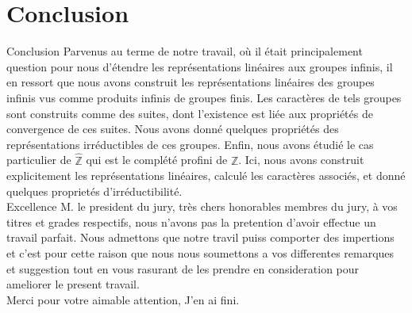 \documentclass[9pt]{beamer}
\begin{document}
	
	\section{Conclusion}
	\begin{frame}{Conclusion}
	Parvenus au terme de notre travail, où il était principalement question pour nous d'étendre les représentations linéaires aux groupes infinis, il en ressort que nous avons construit les représentations linéaires des groupes infinis vus comme produits infinis de groupes finis.
	Les caractères de tels groupes sont construits comme des suites, dont l'existence est liée aux propriétés de convergence de ces suites. Nous avons donné quelques propriétés des représentations irréductibles de ces groupes.
	Enfin, nous avons étudié le cas particulier de \(\widehat{\mathbb{Z}}\) qui est le complété profini de \( \mathbb{Z} \). Ici, nous avons construit explicitement les représentations linéaires, calculé les caractères associés, et donné quelques proprietés d’irréductibilité.\\
	Excellence M. le president du jury, très chers honorables membres du jury, à vos titres et grades respectifs, nous n'avons pas la pretention d'avoir effectue un travail parfait. Nous admettons que notre travil puiss comporter des impertions et c'est pour cette raison que nous nous soumettons a vos differentes remarques et suggestion tout en vous rasurant de les prendre en consideration pour ameliorer le present travail.\\
	
	Merci pour votre aimable attention, J'en ai fini.
	\end{frame}
	
	
\end{document}
